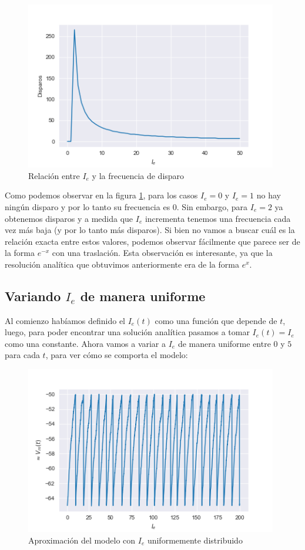 \documentclass [a4paper,12pt,oneside,final]{article}
\begin{document}
\begin{figure}[ht]
  \centering
  \includegraphics[width=11cm,keepaspectratio]{./diagramas/grafico_c.png}
  \caption{Relación entre $I_e$ y la frecuencia de disparo}\label{fig:c}
\end{figure}

Como podemos observar en la figura \ref{fig:c}, para los casos $I_e = 0$ y $I_e = 1$ no hay ningún disparo y por lo tanto su frecuencia es 0. Sin embargo, para $I_e = 2$ ya obtenemos disparos y a medida que $I_e$ incrementa tenemos una frecuencia cada vez más baja (y por lo tanto más disparos). Si bien no vamos a buscar cuál es la relación exacta entre estos valores, podemos observar fácilmente que parece ser de la forma $e^{-x}$ con una traslación. Esta observación es interesante, ya que la resolución analítica que obtuvimos anteriormente era de la forma $e^x$.

\subsection{Variando $I_e$ de manera uniforme}

Al comienzo habíamos definido el $I_e(t)$ como una función que depende de $t$, luego, para poder encontrar una solución analítica pasamos a tomar $I_e(t) = I_e$ como una constante. Ahora vamos a variar a $I_e$ de manera uniforme entre $0$ y $5$ para cada $t$, para ver cómo se comporta el modelo:

\begin{figure}[ht]
  \centering
  \includegraphics[width=11cm,keepaspectratio]{./diagramas/grafico_d.png}
  \caption{Aproximación del modelo con $I_e$ uniformemente distribuido}\label{fig:d}
\end{figure}
\end{document}
